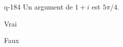 \begin{truefalse}{q-184}
Un argument de $1+i$ est $5\pi/4$.
\item Vrai
\item* Faux
\end{truefalse}

